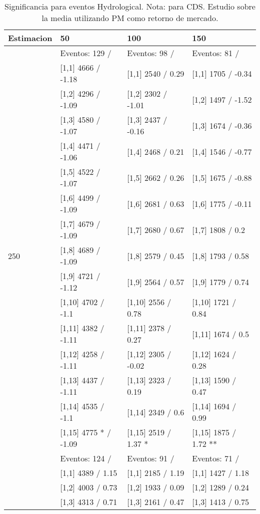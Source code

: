 \begin{table}

\caption{Significancia para eventos Hydrological. Nota: para CDS. Estudio sobre la media utilizando PM como retorno de mercado.}
\centering
\begin{tabular}[t]{llll}
\toprule
Estimacion & 50 & 100 & 150\\
\midrule
 & Eventos:  129 / & Eventos:  98 / & Eventos:  81 /\\
 & {}[1,1] 4666  / -1.18 & {}[1,1] 2540  / 0.29 & {}[1,1] 1705  / -0.34\\
 & {}[1,2] 4296  / -1.09 & {}[1,2] 2302  / -1.01 & {}[1,2] 1497  / -1.52\\
 & {}[1,3] 4580  / -1.07 & {}[1,3] 2437  / -0.16 & {}[1,3] 1674  / -0.36\\
 & {}[1,4] 4471  / -1.06 & {}[1,4] 2468  / 0.21 & {}[1,4] 1546  / -0.77\\
\addlinespace
 & {}[1,5] 4522  / -1.07 & {}[1,5] 2662  / 0.26 & {}[1,5] 1675  / -0.88\\
 & {}[1,6] 4499  / -1.09 & {}[1,6] 2681  / 0.63 & {}[1,6] 1775  / -0.11\\
 & {}[1,7] 4679  / -1.09 & {}[1,7] 2680  / 0.67 & {}[1,7] 1808  / 0.2\\
250 & {}[1,8] 4689  / -1.09 & {}[1,8] 2579  / 0.45 & {}[1,8] 1793  / 0.58\\
 & {}[1,9] 4721  / -1.12 & {}[1,9] 2564  / 0.57 & {}[1,9] 1779  / 0.74\\
\addlinespace
 & {}[1,10] 4702  / -1.1 & {}[1,10] 2556  / 0.78 & {}[1,10] 1721  / 0.84\\
 & {}[1,11] 4382  / -1.11 & {}[1,11] 2378  / 0.27 & {}[1,11] 1674  / 0.5\\
 & {}[1,12] 4258  / -1.11 & {}[1,12] 2305  / -0.02 & {}[1,12] 1624  / 0.28\\
 & {}[1,13] 4437  / -1.11 & {}[1,13] 2323  / 0.19 & {}[1,13] 1590  / 0.47\\
 & {}[1,14] 4535  / -1.1 & {}[1,14] 2349  / 0.6 & {}[1,14] 1694  / 0.99\\
\addlinespace
 & {}[1,15] 4775 * / -1.09 & {}[1,15] 2519  / 1.37 * & {}[1,15] 1875  / 1.72 **\\
 & Eventos:  124 / & Eventos:  91 / & Eventos:  71 /\\
 & {}[1,1] 4389  / 1.15 & {}[1,1] 2185  / 1.19 & {}[1,1] 1427  / 1.18\\
 & {}[1,2] 4003  / 0.73 & {}[1,2] 1933  / 0.09 & {}[1,2] 1289  / 0.24\\
 & {}[1,3] 4313  / 0.71 & {}[1,3] 2161  / 0.47 & {}[1,3] 1413  / 0.75\\

\end{tabular}
\end{table}
